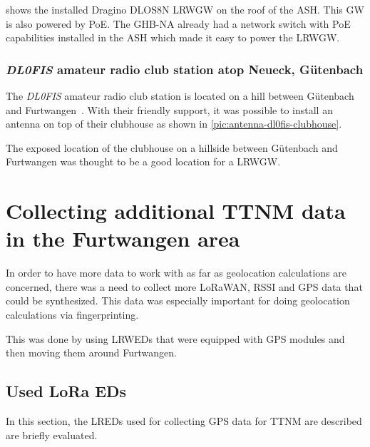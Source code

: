  shows the installed Dragino DLOS8N \acl{LRWGW} on the roof of the \ac{ASH}.
This \acl{GW} is also powered by \ac{PoE}.
The \acl{GHB-NA} already had a network switch with \ac{PoE} capabilities installed in the \ac{ASH} which made it easy to power the \acl{LRWGW}.

\subsubsection{\emph{DL0FIS} amateur radio club station atop Neueck, Gütenbach}

The \emph{DL0FIS} amateur radio club station is located on a hill between Gütenbach and Furtwangen~\cite{dl0fis_clubstation_2023}.
With their friendly support, it was possible to install an antenna on top of their clubhouse as shown in \cref{pic:antenna-dl0fis-clubhouse}.

The exposed location of the clubhouse on a hillside between Gütenbach and Furtwangen was thought to be a good location for a \acl{LRWGW}.

\section{Collecting additional \acl{TTNM} data in the Furtwangen area}\label{sec:collecting-additional-ttnm-data}

In order to have more data to work with as far as geolocation calculations are concerned, there was a need to collect more \ac{LoRaWAN}, \ac{RSSI} and \ac{GPS} data that could be synthesized.
This data was especially important for doing geolocation calculations via fingerprinting.

This was done by using \aclp{LRWED} that were equipped with \ac{GPS} modules and then moving them around Furtwangen.

\subsection{Used \acs{LoRa} \aclp{ED}}\label{subsec:used-lora-devices}

In this section, the \aclp{LRED} used for collecting \ac{GPS} data for \ac{TTNM} are described are briefly evaluated.

